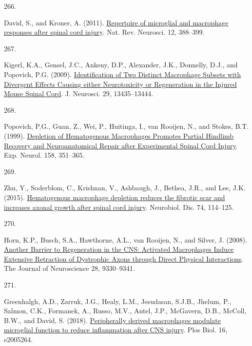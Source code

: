 \documentclass[
]{article}
\newlength{\cslhangindent}
\newlength{\csllabelwidth}
\newlength{\cslentryspacingunit} %
\newenvironment{CSLReferences}[2] %
 {%
  \setlength{\parindent}{0pt}
  \ifodd #1
  \let\oldpar\par
  \def\par{\hangindent=\cslhangindent\oldpar}
  \fi
  \setlength{\parskip}{#2\cslentryspacingunit}
 }%
 {}
\newcommand{\CSLLeftMargin}[1]{\parbox[t]{\csllabelwidth}{#1}}
\newcommand{\CSLRightInline}[1]{\parbox[t]{\linewidth - \csllabelwidth}{#1}\break}
\begin{document}
\begin{CSLReferences}{0}{0}
\leavevmode{}%
\CSLLeftMargin{266. }
\CSLRightInline{David, S., and Kroner, A. (2011). \href{https://doi.org/10.1038/nrn3053}{Repertoire of microglial and macrophage responses after spinal cord injury}. Nat. Rev. Neurosci. 12, 388--399.}

\leavevmode{}%
\CSLLeftMargin{267. }
\CSLRightInline{Kigerl, K.A., Gensel, J.C., Ankeny, D.P., Alexander, J.K., Donnelly, D.J., and Popovich, P.G. (2009). \href{https://doi.org/10.1523/JNEUROSCI.3257-09.2009}{Identification of {Two Distinct Macrophage Subsets} with {Divergent Effects Causing} either {Neurotoxicity} or {Regeneration} in the {Injured Mouse Spinal Cord}}. J. Neurosci. 29, 13435--13444.}

\leavevmode{}%
\CSLLeftMargin{268. }
\CSLRightInline{Popovich, P.G., Guan, Z., Wei, P., Huitinga, I., van Rooijen, N., and Stokes, B.T. (1999). \href{https://doi.org/10.1006/exnr.1999.7118}{Depletion of {Hematogenous Macrophages Promotes Partial Hindlimb Recovery} and {Neuroanatomical Repair} after {Experimental Spinal Cord Injury}}. Exp. Neurol. 158, 351--365.}

\leavevmode{}%
\CSLLeftMargin{269. }
\CSLRightInline{Zhu, Y., Soderblom, C., Krishnan, V., Ashbaugh, J., Bethea, J.R., and Lee, J.K. (2015). \href{https://doi.org/10.1016/j.nbd.2014.10.024}{Hematogenous macrophage depletion reduces the fibrotic scar and increases axonal growth after spinal cord injury}. Neurobiol. Dis. 74, 114--125.}

\leavevmode{}%
\CSLLeftMargin{270. }
\CSLRightInline{Horn, K.P., Busch, S.A., Hawthorne, A.L., van Rooijen, N., and Silver, J. (2008). \href{https://doi.org/10.1523/JNEUROSCI.2488-08.2008}{Another {Barrier} to {Regeneration} in the {CNS}: {Activated Macrophages Induce Extensive Retraction} of {Dystrophic Axons} through {Direct Physical Interactions}}. The Journal of Neuroscience 28, 9330--9341.}

\leavevmode{}%
\CSLLeftMargin{271. }
\CSLRightInline{Greenhalgh, A.D., Zarruk, J.G., Healy, L.M., Jesudasan, S.J.B., Jhelum, P., Salmon, C.K., Formanek, A., Russo, M.V., Antel, J.P., McGavern, D.B., McColl, B.W., and David, S. (2018). \href{https://doi.org/10.1371/journal.pbio.2005264}{Peripherally derived macrophages modulate microglial function to reduce inflammation after {CNS} injury}. Plos Biol. 16, e2005264.}


\end{CSLReferences}
\end{document}
